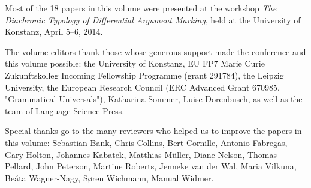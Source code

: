 \begin{refsection}

Most of the 18 papers in this volume were presented at the workshop \emph{The Diachronic Typology of Differential Argument Marking}, held at the University of Konstanz, April 5–6, 2014.

The volume editors thank those whose generous support made the conference and this volume possible: 
the University of Konstanz, EU FP7 Marie Curie Zukunftskolleg Incoming Fellowship Programme (grant 291784), the Leipzig University, the European Research Council (ERC Advanced Grant 670985, "Grammatical Universals"), Katharina Sommer, Luise Dorenbusch, as well as the team of Language Science Press.

Special thanks go to the many reviewers who helped us to improve the papers in this volume: Sebastian Bank, Chris Collins, Bert Cornille, Antonio Fabregas, Gary Holton, Johannes Kabatek, Matthias Müller, Diane Nelson, Thomas Pellard, John Peterson, Martine Roberts, Jenneke van der Wal, Maria Vilkuna, Beáta Wagner-Nagy, Søren Wichmann, Manual Widmer.
 
\end{refsection}

